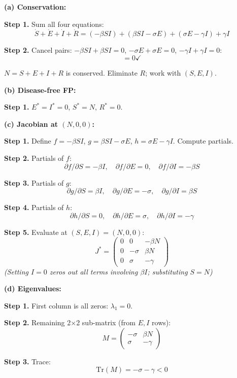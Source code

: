\documentclass[10pt]{article}
\newcommand{\stepwhy}[1]{\textcolor{blue!60!black}{\small\textit{(#1)}}}
\begin{document}
\begin{solution}
\textbf{(a) Conservation:}

\textbf{Step 1.} Sum all four equations:
\[
\dot S + \dot E + \dot I + \dot R = (-\beta SI) + (\beta SI - \sigma E) + (\sigma E - \gamma I) + \gamma I
\]

\textbf{Step 2.} Cancel pairs: $-\beta SI + \beta SI = 0$, $-\sigma E + \sigma E = 0$, $-\gamma I + \gamma I = 0$:
\[
= 0 \checkmark
\]

$N = S + E + I + R$ is conserved. Eliminate $R$; work with $(S, E, I)$.

\medskip\textbf{(b) Disease-free FP:}

\textbf{Step 1.} $E^* = I^* = 0$, $S^* = N$, $R^* = 0$.

\medskip\textbf{(c) Jacobian at $(N, 0, 0)$:}

\textbf{Step 1.} Define $f = -\beta SI$, $g = \beta SI - \sigma E$, $h = \sigma E - \gamma I$. Compute partials.

\textbf{Step 2.} Partials of $f$:
\[
\partial f/\partial S = -\beta I, \quad \partial f/\partial E = 0, \quad \partial f/\partial I = -\beta S
\]

\textbf{Step 3.} Partials of $g$:
\[
\partial g/\partial S = \beta I, \quad \partial g/\partial E = -\sigma, \quad \partial g/\partial I = \beta S
\]

\textbf{Step 4.} Partials of $h$:
\[
\partial h/\partial S = 0, \quad \partial h/\partial E = \sigma, \quad \partial h/\partial I = -\gamma
\]

\textbf{Step 5.} Evaluate at $(S,E,I) = (N,0,0)$:
\[
J^* = \begin{pmatrix} 0 & 0 & -\beta N \\ 0 & -\sigma & \beta N \\ 0 & \sigma & -\gamma \end{pmatrix}
\]
\stepwhy{Setting $I=0$ zeros out all terms involving $\beta I$; substituting $S=N$}

\medskip\textbf{(d) Eigenvalues:}

\textbf{Step 1.} First column is all zeros: $\lambda_1 = 0$.

\textbf{Step 2.} Remaining 2$\times$2 sub-matrix (from $E, I$ rows):
\[
M = \begin{pmatrix} -\sigma & \beta N \\ \sigma & -\gamma \end{pmatrix}
\]

\textbf{Step 3.} Trace:
\[
\text{Tr}(M) = -\sigma - \gamma < 0
\]


\end{solution}
\end{document}
